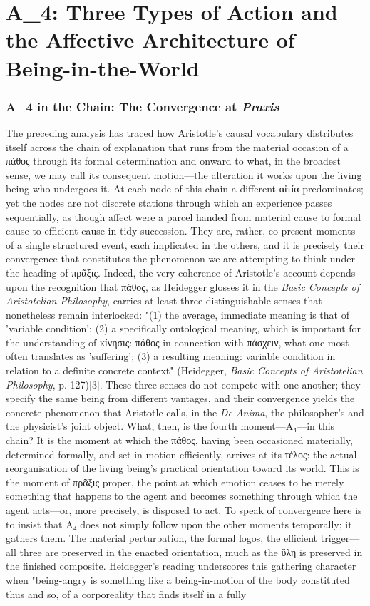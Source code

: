 \documentclass{article}
\begin{document}
\section{A\_4: Three Types of Action and the Affective Architecture of Being-in-the-World}

\subsubsection*{A_4 in the Chain: The Convergence at \textit{Praxis}}

The preceding analysis has traced how Aristotle's causal vocabulary distributes itself across the chain of explanation that runs from the material occasion of a πάθος through its formal determination and onward to what, in the broadest sense, we may call its consequent motion—the alteration it works upon the living being who undergoes it. At each node of this chain a different αἰτία predominates; yet the nodes are not discrete stations through which an experience passes sequentially, as though affect were a parcel handed from material cause to formal cause to efficient cause in tidy succession. They are, rather, co-present moments of a single structured event, each implicated in the others, and it is precisely their convergence that constitutes the phenomenon we are attempting to think under the heading of πρᾶξις. Indeed, the very coherence of Aristotle's account depends upon the recognition that πάθος, as Heidegger glosses it in the \textit{Basic Concepts of Aristotelian Philosophy}, carries at least three distinguishable senses that nonetheless remain interlocked: "(1) the average, immediate meaning is that of 'variable condition'; (2) a specifically ontological meaning, which is important for the understanding of κίνησις: πάθος in connection with πάσχειν, what one most often translates as 'suffering'; (3) a resulting meaning: variable condition in relation to a definite concrete context" (Heidegger, \textit{Basic Concepts of Aristotelian Philosophy}, p. 127)[3]. These three senses do not compete with one another; they specify the same being from different vantages, and their convergence yields the concrete phenomenon that Aristotle calls, in the \textit{De Anima}, the philosopher's and the physicist's joint object. What, then, is the fourth moment—A₄—in this chain? It is the moment at which the πάθος, having been occasioned materially, determined formally, and set in motion efficiently, arrives at its τέλος: the actual reorganisation of the living being's practical orientation toward its world. This is the moment of πρᾶξις proper, the point at which emotion ceases to be merely something that happens to the agent and becomes something through which the agent acts—or, more precisely, is disposed to act. To speak of convergence here is to insist that A₄ does not simply follow upon the other moments temporally; it gathers them. The material perturbation, the formal logos, the efficient trigger—all three are preserved in the enacted orientation, much as the ὕλη is preserved in the finished composite. Heidegger's reading underscores this gathering character when "being-angry is something like a being-in-motion of the body constituted thus and so, of a corporeality that finds itself in a fully 
\end{document}
